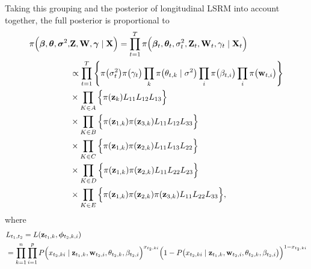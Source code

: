 \documentclass[a4paper, 11pt]{report}
\begin{document}
\begin{itemize}
\quad Taking this grouping and the posterior of longitudinal LSRM into account together, the full posterior is proportional to
\begin{equation}
\label{full.posterior}
\begin{split}
\pi\Big(\boldsymbol\beta, \boldsymbol\theta, \boldsymbol\sigma^2, &{\bf Z}, {\bf W}, \boldsymbol\gamma \mid {\bf X}\Big) = \prod_{t=1}^T \pi\Big(\boldsymbol\beta_t, \boldsymbol\theta_t, \sigma_t^2, {\bf Z}_t, {\bf W}_t, \gamma_t \mid {\bf X}_t\Big)\\ 
&\propto \prod_{t=1}^T \Bigg\{\pi\big(\sigma_t^2\big) \pi\big(\gamma_t\big) \prod_{k}\pi\big(\theta_{t,k} \mid \sigma^2\big) \prod_{i}\pi\big(\beta_{t,i}\big)
\prod_{i}\pi\big({\bf w}_{t,i}\big) \Bigg\}\\
&\times \prod_{K\in A}\Big \{\pi({\bf z}_{k}) L_{11} L_{12} L_{13} \Big \}\\
&\times \prod_{K\in B}\Big \{\pi({\bf z}_{1,k}) \pi({\bf z}_{3,k}) L_{11} L_{12} L_{33}\Big \}\\
&\times \prod_{K\in C}\Big \{\pi({\bf z}_{1,k}) \pi({\bf z}_{2,k}) L_{11} L_{13} L_{22} \Big \}\\
&\times \prod_{K\in D}\Big \{\pi({\bf z}_{1,k}) \pi({\bf z}_{2,k}) L_{11} L_{22} L_{23} \Big \}\\
&\times \prod_{K\in E}\Big \{\pi({\bf z}_{1,k}) \pi({\bf z}_{2,k}) \pi({\bf z}_{3,k}) L_{11} L_{22} L_{33} \Big \},
\end{split}
\end{equation}
where
\begin{equation}\notag
\begin{split}
&L_{t_1,t_2} = L({\bf z}_{t_1,k}, {\boldsymbol \phi}_{t_2,k,i})\\
&= \prod_{k=1}^n\prod_{i=1}^p P\Big(x_{t_2,ki} \mid {\bf z}_{t_1,k}, {\bf w}_{t_2,i}, \theta_{t_2,k}, \beta_{t_2,i}\Big)^{x_{t_2,ki}}
\Big(1-P\big(x_{t_2,ki} \mid {\bf z}_{t_1,k}, {\bf w}_{t_2,i}, \theta_{t_2,k}, \beta_{t_2,i}\big)\Big)^{1-x_{t_2,ki}}
\end{split}
\end{equation}


\end{itemize}
\end{document}
